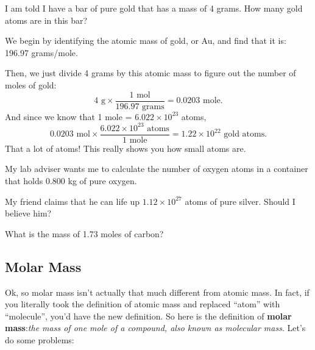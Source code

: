 \begin{problem}
I am told I have a bar of pure gold that has a mass of 4 grams. How many gold atoms are in this bar? 
\end{problem}
\begin{solution}
We begin by identifying the atomic mass of gold, or Au, and find that it is: 196.97 grams/mole. \par
Then, we just divide 4 grams by this atomic mass to figure out the number of moles of gold:
$$4 \text{ g} \times \frac{1 \text{ mol}}{196.97\text{ grams}} = 0.0203 \text{ mole}.$$
And since we know that 1 mole = $6.022 \times 10^{23}$ atoms, 
$$0.0203 \text{ mol} \times \frac{6.022 \times 10^{23} \text{ atoms}}{1 \text{ mole}} = \boxed{1.22 \times 10^{22} \text{ gold atoms}}.$$
That a lot of atoms! This really shows you how small atoms are.
\end{solution}
\begin{problem}
My lab adviser wants me to calculate the number of oxygen atoms in a container that holds 0.800 kg of pure oxygen.
\end{problem}
\begin{problem}
My friend claims that he can life up $1.12\times10^{27}$ atoms of pure silver. Should I believe him?
\end{problem}
\begin{problem}
What is the mass of 1.73 moles of carbon?
\end{problem}

\subsection{Molar Mass}
Ok, so molar mass isn't actually that much different from atomic mass. In fact, if you literally took the definition of atomic mass and replaced ``atom'' with ``molecule'', you'd have the new definition. So here is the definition of \textbf{molar mass}:\textit{the mass of one mole of a compound, also known as molecular mass}. Let's do some problems:


